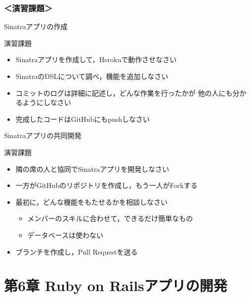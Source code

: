 \documentclass[t, aspectratio=169]{beamer}
\begin{document}
\section{＜演習課題＞}
\label{sec-5-3}
\begin{frame}[label=sec-5-3-1]{Sinatraアプリの作成}
\begin{block}{演習課題}
\begin{itemize}
\item Sinatraアプリを作成して，Herokuで動作させなさい
\item SinatraのDSLについて調べ，機能を追加しなさい
\item コミットのログは詳細に記述し，どんな作業を行ったかが
他の人にも分かるようにしなさい
\item 完成したコードはGitHubにもpushしなさい
\end{itemize}
\end{block}
\end{frame}

\begin{frame}[label=sec-5-3-2]{Sinatraアプリの共同開発}
\begin{block}{演習課題}
\begin{itemize}
\item 隣の席の人と協同でSinatraアプリを開発しなさい
\item 一方がGitHubのリポジトリを作成し，もう一人がForkする
\item 最初に，どんな機能をもたせるかを相談しなさい
\begin{itemize}
\item メンバーのスキルに合わせて，できるだけ簡単なもの
\item データベースは使わない
\end{itemize}
\item ブランチを作成し，Pull Requestを送る
\end{itemize}
\end{block}
\end{frame}
\part{第6章 Ruby on Railsアプリの開発}
\label{sec-6}
\end{document}
